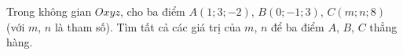 \begin{ex}
Trong không gian $Oxyz$, cho ba điểm $A(1;3;-2)$, $B(0;-1;3)$, $C(m;n;8)$ (với $m$, $n$ là tham số). Tìm tất cả các giá trị của $m$, $n$ để ba điểm $A$, $B$, $C$ thẳng hàng.
\end{ex}
